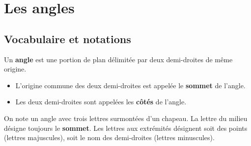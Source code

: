 \documentclass[a4paper]{book}
\begin{document}
\setcounter{chapter}{9} %
\renewcommand{\monTitre}{Les angles}
\chapter{\monTitre}
\thispagestyle{fancy}

\section{Vocabulaire et notations}
    
    \begin{definition}
        Un \textbf{angle} est une portion de plan délimitée par deux demi-droites de même origine.
        \begin{itemize}[label=\textbullet]
            \item L'origine commune des deux demi-droites est appelée le \textbf{sommet} de l'angle.
            \item Les deux demi-droites sont appelées les \textbf{côtés} de l'angle.
        \end{itemize}
    \end{definition}

    
    \begin{remarque}
        On note un angle avec trois lettres surmontées d'un chapeau. La lettre du milieu désigne toujours le \textbf{sommet}. 
        Les lettres aux extrémités désignent soit des points (lettres majuscules), soit le nom des demi-droites (lettres minuscules).
    \end{remarque}
    
\end{document}
